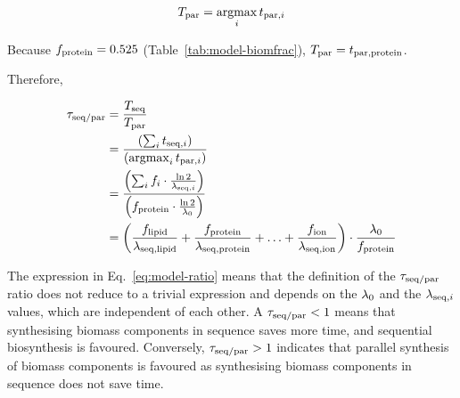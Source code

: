 
\begin{equation}
  T_{\mathrm{par}} = \operatorname*{argmax}_{i} t_{\mathrm{par},i}
  \label{eq:model-b}
\end{equation}

Because $f_{\mathrm{protein}} = 0.525$ (Table~\ref{tab:model-biomfrac}), $T_{\mathrm{par}} = t_{\mathrm{par},\mathrm{protein}}$.

Therefore,

\begin{equation}
  \begin{aligned}
    \tau_{\mathrm{seq}/\mathrm{par}} &= \frac{T_{\mathrm{seq}}}{T_{\mathrm{par}}} \\
    & = \frac{\left( \sum_{i} t_{\mathrm{seq},i} \right)}{\left( \operatorname*{argmax}_{i} t_{\mathrm{par},i} \right)}\\
    & = \frac{\left(  \sum_{i} f_{i} \cdot \frac{\ln 2}{\lambda_{\mathrm{seq},i}} \right)}{\left( f_{\mathrm{protein}} \cdot \frac{\ln 2}{\lambda_{0}} \right)}\\
    & = \left( \frac{f_{\mathrm{lipid}}}{\lambda_{\mathrm{seq},\mathrm{lipid}}} + \frac{f_{\mathrm{protein}}}{\lambda_{\mathrm{seq},\mathrm{protein}}} + \ldots + \frac{f_{\mathrm{ion}}}{\lambda_{\mathrm{seq},\mathrm{ion}}} \right) \cdot \frac{\lambda_{0}}{f_{\mathrm{protein}}}
    \end{aligned}
  \label{eq:model-ratio}
\end{equation}

The expression in Eq.\ \ref{eq:model-ratio} means that the definition of the $\tau_{\mathrm{seq}/\mathrm{par}}$ ratio does not reduce to a trivial expression and depends on the $\lambda_{0}$ and the $\lambda_{\mathrm{seq},i}$ values, which are independent of each other.
A $\tau_{\mathrm{seq}/\mathrm{par}} < 1$ means that synthesising biomass components in sequence saves more time, and sequential biosynthesis is favoured.
Conversely, $\tau_{\mathrm{seq}/\mathrm{par}} > 1$ indicates that parallel synthesis of biomass components is favoured as synthesising biomass components in sequence does not save time.


